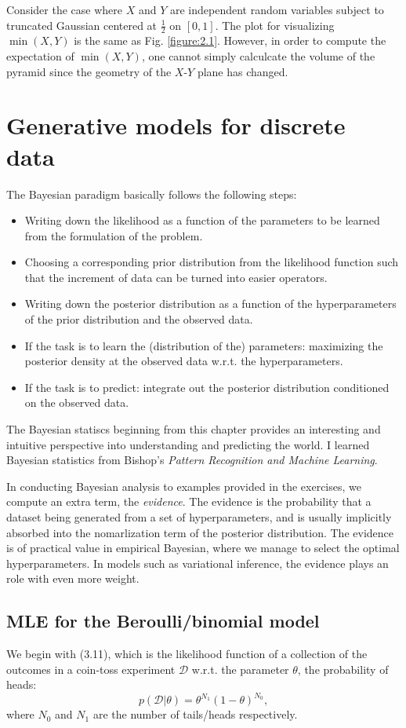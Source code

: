 \documentclass[UTF8]{ctexart}
\begin{document}
Consider the case where $X$ and $Y$ are independent random variables subject to truncated Gaussian centered at $\frac{1}{2}$ on $[0,1]$.
The plot for visualizing $\min(X,Y)$ is the same as Fig. \ref{figure:2.1}.
However, in order to compute the expectation of $\min(X,Y)$, one cannot simply calculcate the volume of the pyramid since the geometry of the $X$-$Y$ plane has changed.



\newpage
\section{Generative models for discrete data}
The Bayesian paradigm basically follows the following steps:
\begin{itemize}
\item Writing down the likelihood as a function of the parameters to be learned from the formulation of the problem.
\item Choosing a corresponding prior distribution from the likelihood function such that the increment of data can be turned into easier operators.
\item Writing down the posterior distribution as a function of the hyperparameters of the prior distribution and the observed data.
\item If the task is to learn the (distribution of the) parameters: maximizing the posterior density at the observed data w.r.t. the hyperparameters.
\item If the task is to predict: integrate out the posterior distribution conditioned on the observed data.
\end{itemize}
The Bayesian statiscs beginning from this chapter provides an interesting and intuitive perspective into understanding and predicting the world.
I learned Bayesian statistics from Bishop's \emph{Pattern Recognition and Machine Learning}.

In conducting Bayesian analysis to examples provided in the exercises, we compute an extra term, the \emph{evidence}.
The evidence is the probability that a dataset being generated from a set of hyperparameters, and is usually implicitly absorbed into the nomarlization term of the posterior distribution.
The evidence is of practical value in empirical Bayesian, where we manage to select the optimal hyperparameters.
In models such as variational inference, the evidence plays an role with even more weight.

\subsection{MLE for the Beroulli/binomial model}
We begin with (3.11), which is the likelihood function of a collection of the outcomes in a coin-toss experiment $\mathcal{D}$ w.r.t. the parameter $\theta$, the probability of heads:
$$p(\mathcal{D}|\theta) = \theta^{N_{1}}(1-\theta)^{N_{0}},$$
where $N_{0}$ and $N_{1}$ are the number of tails/heads respectively.
\end{document}
